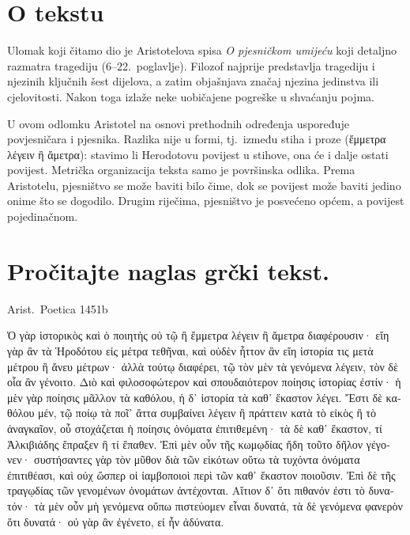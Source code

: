 


\section*{O tekstu}

Ulomak koji čitamo dio je Aristotelova spisa \textit{O pjesničkom umijeću} koji detaljno razmatra tragediju (6–22.\ poglavlje). Filozof najprije predstavlja tragediju i njezinih ključnih šest dijelova, a zatim objašnjava značaj njezina jedinstva ili cjelovitosti. Nakon toga izlaže neke uobičajene pogreške u shvaćanju pojma.
 
U ovom odlomku Aristotel na osnovi prethodnih određenja uspoređuje povjesničara i pjesnika. Razlika nije u formi, tj.\ između stiha i proze \textgreek[variant=ancient]{(ἔμμετρα λέγειν ἢ ἄμετρα):} stavimo li Herodotovu povijest u stihove, ona će i dalje ostati povijest. Metrička organizacija teksta samo je površinska odlika. Prema Aristotelu, pjesništvo se može baviti bilo čime, dok se povijest može baviti jedino onime što se dogodilo. Drugim riječima, pjesništvo je posvećeno općem, a povijest pojedinačnom.


\section*{Pročitajte naglas grčki tekst.}

Arist.\ Poetica 1451b


\medskip


{\large

\begin{greek}

\noindent  Ὁ γὰρ ἱστορικὸς καὶ ὁ ποιητὴς οὐ τῷ ἢ ἔμμετρα λέγειν ἢ ἄμετρα διαφέρουσιν· εἴη γὰρ ἂν τὰ Ἡροδότου εἰς μέτρα τεθῆναι, καὶ οὐδὲν ἧττον ἂν εἴη ἱστορία τις μετὰ μέτρου ἢ ἄνευ μέτρων· ἀλλὰ τούτῳ διαφέρει, τῷ τὸν μὲν τὰ γενόμενα λέγειν, τὸν δὲ οἷα ἂν γένοιτο.  Διὸ καὶ φιλοσοφώτερον καὶ σπουδαιότερον ποίησις ἱστορίας ἐστίν· ἡ μὲν γὰρ ποίησις μᾶλλον τὰ καθόλου, ἡ δ᾿ ἱστορία τὰ καθ᾿ ἕκαστον λέγει. Ἔστι δὲ καθόλου μέν, τῷ ποίῳ τὰ ποῖ᾿ ἄττα συμβαίνει λέγειν ἢ πράττειν κατὰ τὸ εἰκὸς ἢ τὸ ἀναγκαῖον, οὗ στοχάζεται ἡ ποίησις ὀνόματα ἐπιτιθεμένη· τὰ δὲ καθ᾿ ἕκαστον, τί Ἀλκιβιάδης ἔπραξεν ἢ τί ἔπαθεν. Ἐπὶ μὲν οὖν τῆς κωμῳδίας ἤδη τοῦτο δῆλον γέγονεν· συστήσαντες γὰρ τὸν μῦθον διὰ τῶν εἰκότων οὕτω τὰ τυχόντα ὀνόματα ἐπιτιθέασι, καὶ οὐχ ὥσπερ οἱ ἰαμβοποιοὶ περὶ τῶν καθ᾿ ἕκαστον ποιοῦσιν. Ἐπὶ δὲ τῆς τραγῳδίας τῶν γενομένων ὀνομάτων ἀντέχονται. Αἴτιον δ᾿ ὅτι πιθανόν ἐστι τὸ δυνατόν· τὰ μὲν οὖν μὴ γενόμενα οὔπω πιστεύομεν εἶναι δυνατά, τὰ δὲ γενόμενα φανερὸν ὅτι δυνατά· οὐ γὰρ ἂν ἐγένετο, εἰ ἦν ἀδύνατα.

\end{greek}

}


